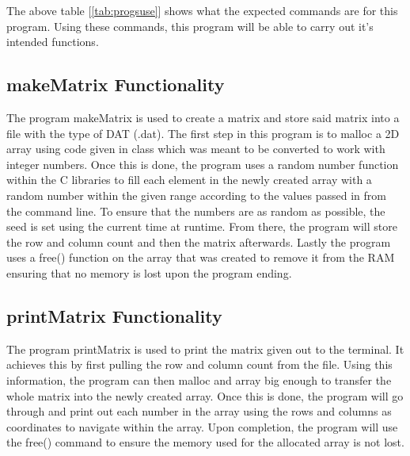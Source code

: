 \documentclass{article}
\begin{document}
    \begin{multicols}{2}
    The above table [\ref{tab:progsuse}] shows what the expected commands are for this program. Using these commands, this program will be able
    to carry out it's intended functions.

    \subsection{makeMatrix Functionality}\label{subsec:makeMatrixFunc}
    The program makeMatrix is used to create a matrix and store said matrix into a file with the type of DAT (.dat). The first step in this program
    is to malloc a 2D array using code given in class which was meant to be converted to work with integer numbers. Once this is done, the program
    uses a random number function within the C libraries to fill each element in the newly created array with a random number within the given range
    according to the values passed in from the command line. To ensure that the numbers are as random as possible, the seed is set using the current
    time at runtime. From there, the program will store the row and column count and then the matrix afterwards. Lastly the program uses a free()
    function on the array that was created to remove it from the RAM ensuring that no memory is lost upon the program ending.
    \subsection{printMatrix Functionality}\label{subsec:printMatrixFunc}
    The program printMatrix is used to print the matrix given out to the terminal. It achieves this by first pulling the row and column count from
    the file. Using this information, the program can then malloc and array big enough to transfer the whole matrix into the newly created array. Once
    this is done, the program will go through and print out each number in the array using the rows and columns as coordinates to navigate within the
    array. Upon completion, the program will use the free() command to ensure the memory used for the allocated array is not lost.

\end{multicols}
\end{document}
